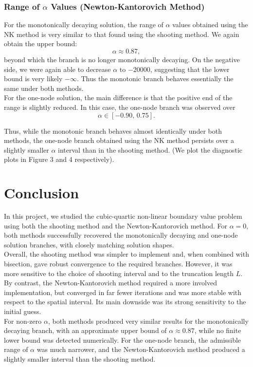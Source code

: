 \documentclass[12pt]{article}
\begin{document}
\subsubsection*{Range of $\alpha$ Values (Newton-Kantorovich Method)}

For the monotonically decaying solution, the range of $\alpha$ values obtained using the NK method is very similar to that found using the shooting method. We again obtain the upper bound:
\[
\alpha \approx 0.87,
\]
beyond which the branch is no longer monotonically decaying. On the negative side, we were again able to decrease $\alpha$ to $-20000$, suggesting that the lower bound is very likely $-\infty$. Thus the monotonic branch behaves essentially the same under both methods.\\

For the one-node solution, the main difference is that the positive end of the range is slightly reduced. In this case, the one-node branch was observed over
\[
\alpha \in [-0.90,\,0.75].
\]

Thus, while the monotonic branch behaves almost identically under both methods, the one-node branch obtained using the NK method persists over a slightly smaller $\alpha$ interval than in the shooting method. (We plot the diagnostic plots in Figure 3 and 4 respectively). 

\section*{Conclusion}

In this project, we studied the cubic-quartic non-linear boundary value problem using both the shooting method and the Newton-Kantorovich method. For $\alpha=0$, both methods successfully recovered the monotonically decaying and one-node solution branches, with closely matching solution shapes.\\

Overall, the shooting method was simpler to implement and, when combined with bisection, gave robust convergence to the required branches. However, it was more sensitive to the choice of shooting interval and to the truncation length $L$. By contrast, the Newton-Kantorovich method required a more involved implementation, but converged in far fewer iterations and was more stable with respect to the spatial interval. Its main downside was its strong sensitivity to the initial guess.\\

For non-zero $\alpha$, both methods produced very similar results for the monotonically decaying branch, with an approximate upper bound of $\alpha \approx 0.87$, while no finite lower bound was detected numerically. For the one-node branch, the admissible range of $\alpha$ was much narrower, and the Newton-Kantorovich method produced a slightly smaller interval than the shooting method.\\
\end{document}
